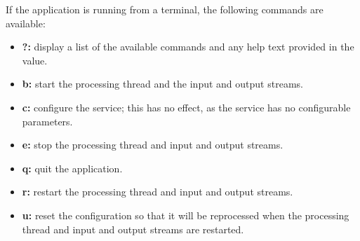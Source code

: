 If the application is running from a terminal, the following commands are available:
\begin{itemize}
\item \textbf{?:} display a list of the available commands and any help text provided in
the  value.
\item \textbf{b:} start the processing thread and the input and output streams. 
\item \textbf{c:} configure the service; this has no effect, as the service has no
configurable parameters. 
\item \textbf{e:} stop the processing thread and input and output streams. 
\item \textbf{q:} quit the application. 
\item \textbf{r:} restart the processing thread and input and output streams. 
\item \textbf{u:} reset the configuration so that it will be reprocessed when the
processing thread and input and output streams are restarted. 
\end{itemize}
\primaryEnd{}
